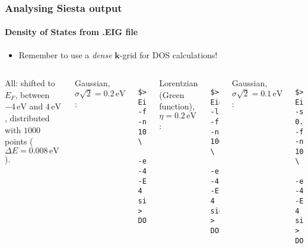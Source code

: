 \begin{frame}[fragile]
  \frametitle{Analysing Siesta output}
  \framesubtitle{Density of States from .EIG file}

  \begin{itemize}
    \item Remember to use a \emph{dense} $\mathbf k$-grid for DOS calculations!
  \end{itemize}

  \begin{columns}
    \footnotesize

    All: shifted to $E_F$, between $-4\,\mathrm{eV}$ and $4\,\mathrm{eV}$, distributed
    with $1000$ points ($\Delta E=0.008\,\mathrm{eV}$).
    \vspace{.5cm}

    Gaussian, $\sigma\sqrt2=0.2\,\mathrm{eV}$:
\begin{verbatim}
  $> Eig2DOS -f -n 1000 \
      -e -4 -E 4 siesta.EIG > DOS.dat
\end{verbatim}

    Lorentzian (Green function), $\eta=0.2\,\mathrm{eV}$:
\begin{verbatim}
  $> Eig2DOS -l -f -n 1000 \
       -e -4 -E 4 siesta.EIG > DOS.dat
\end{verbatim}

    Gaussian, $\sigma\sqrt2=0.1\,\mathrm{eV}$:
\begin{verbatim}
  $> Eig2DOS -s 0.1 -f -n 1000 \
      -e -4 -E 4 siesta.EIG > DOS.dat
\end{verbatim}



    

  \end{columns}

\end{frame}


